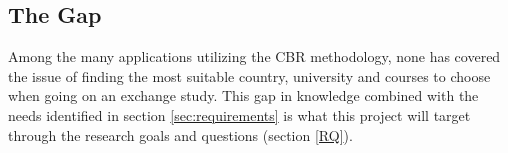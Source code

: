 \subsection{The Gap}
Among the many applications utilizing the CBR methodology, none has covered the issue of finding the most suitable country, university and courses to choose when going on an exchange study. This gap in knowledge combined with the needs identified in section \ref{sec:requirements} is what this project will target through the research goals and questions (section \ref{RQ}).
